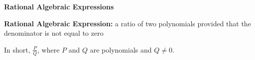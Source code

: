 \begin{center}
\textbf{Rational Algebraic Expressions}
\end{center}

\vspace*{1ex}

\textbf{Rational Algebraic Expression: } a ratio of two polynomials provided that the denominator is not equal to zero 

\vspce 

In short, $\displaystyle \frac{P}{Q}$, where $P$ and $Q$ are polynomials and $Q \neq 0$.   
